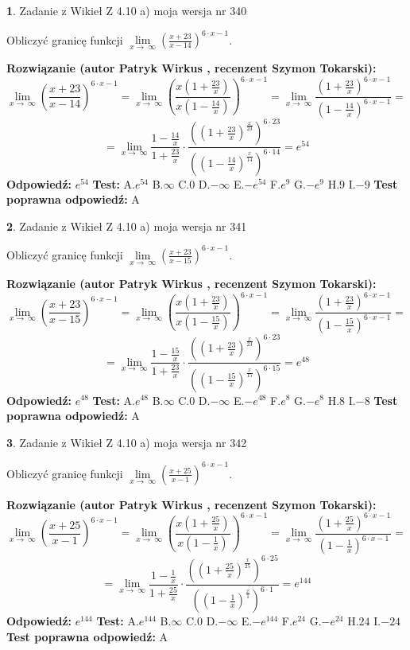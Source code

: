 \documentclass[12pt, a4paper]{article}
\theoremstyle{definition} %
\newtheorem{zad}{}
\newcommand{\zadStart}[1]{\begin{zad}#1\newline}
\newcommand{\zadStop}{\end{zad}}
\newcommand{\rozwStart}[2]{\noindent \textbf{Rozwiązanie (autor #1 , recenzent #2): }\newline}
\newcommand{\rozwStop}{\newline}
\newcommand{\odpStart}{\noindent \textbf{Odpowiedź:}\newline}
\newcommand{\odpStop}{\newline}
\newcommand{\testStart}{\noindent \textbf{Test:}\newline}
\newcommand{\testStop}{\newline}
\newcommand{\kluczStart}{\noindent \textbf{Test poprawna odpowiedź:}\newline}
\newcommand{\kluczStop}{\newline}
\begin{document}
\zadStart{Zadanie z Wikieł Z 4.10 a) moja wersja nr 340}

Obliczyć granicę funkcji  $\lim\limits_{x\to\ \infty}(\frac{x+23}{x-14})^{6\cdot x-1}$.
\zadStop
\rozwStart{Patryk Wirkus}{Szymon Tokarski}
$$\lim\limits_{x\to\ \infty}(\frac{x+23}{x-14})^{6\cdot x-1} = \lim\limits_{x\to\ \infty}(\frac{x(1+\frac{23}{x})}{x(1-\frac{14}{x})})^{6\cdot x-1}=\lim\limits_{x\to\ \infty}\frac{(1+\frac{23}{x})^{6\cdot x-1}}{(1-\frac{14}{x})^{6\cdot x-1}}=$$
$$=\lim\limits_{x\to\ \infty}\frac{1-\frac{14}{x}}{1+\frac{23}{x}}\cdot\frac{((1+\frac{23}{x})^{\frac{x}{23}})^{6\cdot23}}{((1-\frac{14}{x})^{\frac{x}{14}})^{6\cdot14}}=e^{54}$$
\rozwStop
\odpStart
$e^{54}$
\odpStop
\testStart
A.$e^{54}$ B.$\infty$ C.$0$ D.$-\infty$ E.$-e^{54}$
F.$e^{9}$ G.$-e^{9}$
H.$9$
I.$-9$
\testStop
\kluczStart
A
\kluczStop



\zadStart{Zadanie z Wikieł Z 4.10 a) moja wersja nr 341}

Obliczyć granicę funkcji  $\lim\limits_{x\to\ \infty}(\frac{x+23}{x-15})^{6\cdot x-1}$.
\zadStop
\rozwStart{Patryk Wirkus}{Szymon Tokarski}
$$\lim\limits_{x\to\ \infty}(\frac{x+23}{x-15})^{6\cdot x-1} = \lim\limits_{x\to\ \infty}(\frac{x(1+\frac{23}{x})}{x(1-\frac{15}{x})})^{6\cdot x-1}=\lim\limits_{x\to\ \infty}\frac{(1+\frac{23}{x})^{6\cdot x-1}}{(1-\frac{15}{x})^{6\cdot x-1}}=$$
$$=\lim\limits_{x\to\ \infty}\frac{1-\frac{15}{x}}{1+\frac{23}{x}}\cdot\frac{((1+\frac{23}{x})^{\frac{x}{23}})^{6\cdot23}}{((1-\frac{15}{x})^{\frac{x}{15}})^{6\cdot15}}=e^{48}$$
\rozwStop
\odpStart
$e^{48}$
\odpStop
\testStart
A.$e^{48}$ B.$\infty$ C.$0$ D.$-\infty$ E.$-e^{48}$
F.$e^{8}$ G.$-e^{8}$
H.$8$
I.$-8$
\testStop
\kluczStart
A
\kluczStop



\zadStart{Zadanie z Wikieł Z 4.10 a) moja wersja nr 342}

Obliczyć granicę funkcji  $\lim\limits_{x\to\ \infty}(\frac{x+25}{x-1})^{6\cdot x-1}$.
\zadStop
\rozwStart{Patryk Wirkus}{Szymon Tokarski}
$$\lim\limits_{x\to\ \infty}(\frac{x+25}{x-1})^{6\cdot x-1} = \lim\limits_{x\to\ \infty}(\frac{x(1+\frac{25}{x})}{x(1-\frac{1}{x})})^{6\cdot x-1}=\lim\limits_{x\to\ \infty}\frac{(1+\frac{25}{x})^{6\cdot x-1}}{(1-\frac{1}{x})^{6\cdot x-1}}=$$
$$=\lim\limits_{x\to\ \infty}\frac{1-\frac{1}{x}}{1+\frac{25}{x}}\cdot\frac{((1+\frac{25}{x})^{\frac{x}{25}})^{6\cdot25}}{((1-\frac{1}{x})^{\frac{x}{1}})^{6\cdot1}}=e^{144}$$
\rozwStop
\odpStart
$e^{144}$
\odpStop
\testStart
A.$e^{144}$ B.$\infty$ C.$0$ D.$-\infty$ E.$-e^{144}$
F.$e^{24}$ G.$-e^{24}$
H.$24$
I.$-24$
\testStop
\kluczStart
A
\kluczStop
\end{document}
